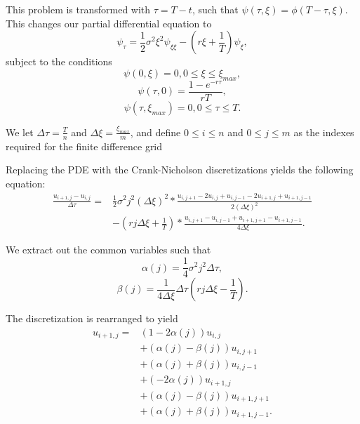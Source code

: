 \documentclass{article}
\begin{document}
This problem is transformed with \(\tau = T - t \), such that \(\psi(\tau, \xi) = \phi(T-\tau, \xi)\). This changes our partial differential equation to
\begin{equation}
  \psi_\tau = \frac{1}{2}\sigma^2\xi^2\psi_{\xi\xi} - (r\xi + \frac{1}{T})\psi_\xi,
\end{equation}
subject to the conditions
\begin{equation}
  \psi(0, \xi) = 0, 0 \le \xi \le \xi_{max},
\end{equation}
\begin{equation}
  \psi(\tau, 0) = \frac{1-e^{-r\tau}}{rT},
\end{equation}
\begin{equation}
  \psi(\tau, \xi_{max}) = 0, 0 \le \tau \le T.
\end{equation}

We let \(\Delta\tau = \frac{T}{n}\) and \(\Delta\xi = \frac{\xi_{max}}{m}\), and define \(0 \le i \le n\) and \(0 \le j \le m\) as the indexes required for the finite difference grid

Replacing the PDE with the Crank-Nicholson discretizations yields the following equation:
\begin{equation}
  \begin{split}
    \frac{u_{i+1, j} - u_{i, j}}{\Delta\tau} = & \frac{1}{2}\sigma^2j^2(\Delta\xi)^2 * \frac{u_{i, j+1} - 2u_{i, j} + u_{i, j-1} -2u_{i+1, j} + u_{i+1, j-1}}{2(\Delta\xi)^2} \\ & - (rj\Delta\xi + \frac{1}{T}) * \frac{u_{i, j+1} - u_{i,j-1} +u_{i+1, j+1} - u_{i+1, j-1}}{4\Delta\xi}.
  \end{split}
\end{equation}

We extract out the common variables such that
\begin{equation}
  \alpha(j) = \frac{1}{4}\sigma^2j^2\Delta\tau,
\end{equation}
\begin{equation}
  \beta(j) = \frac{1}{4\Delta\xi}\Delta\tau(rj\Delta\xi - \frac{1}{T}).
\end{equation}

The discretization is rearranged to yield
\begin{equation}
  \begin{split}
    u_{i+1, j} = & (1-2\alpha(j))u_{i, j} \\
    & + (\alpha(j)-\beta(j))u_{i, j+1}\\
    & + (\alpha(j)+\beta(j))u_{i, j-1}\\
    & + (-2\alpha(j))u_{i+1, j}\\
    & + (\alpha(j)-\beta(j))u_{i+1, j+1}\\
    & + (\alpha(j)+\beta(j))u_{i+1, j-1}.
  \end{split}
\end{equation}
\end{document}
